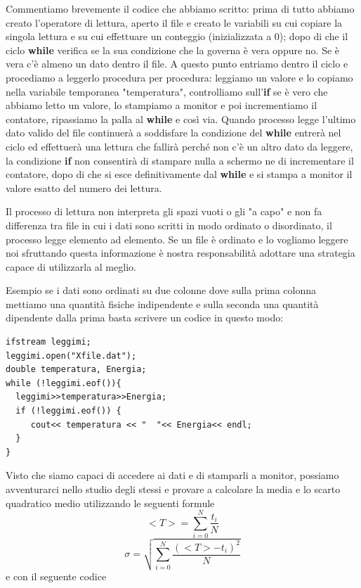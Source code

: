 \documentclass[11pt,fleqn]{book} %
\begin{document}
 Commentiamo brevemente il codice che abbiamo scritto: prima di tutto abbiamo creato l'operatore di lettura, aperto il file e creato le variabili su cui copiare la singola lettura e su cui effettuare un conteggio (inizializzata a 0); dopo di che il ciclo \textbf{while} verifica se la sua condizione che la governa è vera oppure no. Se è vera c'è almeno un dato dentro il file. A questo punto entriamo dentro il ciclo e procediamo  a leggerlo procedura per procedura: leggiamo un valore e lo copiamo nella variabile temporanea "temperatura", controlliamo sull'\textbf{if} se è vero che abbiamo letto un valore, lo stampiamo a monitor e poi incrementiamo il contatore, ripassiamo la palla al \textbf{while} e così via.
 Quando processo legge l'ultimo dato valido del file continuerà a soddisfare la condizione del \textbf{while} entrerà nel ciclo ed effettuerà una lettura che fallirà perché non c'è un altro dato da leggere, la condizione \textbf{if} non consentirà di stampare nulla a schermo ne di incrementare il contatore, dopo di che si esce definitivamente dal \textbf{while} e si stampa a monitor il valore esatto del numero dei lettura.
 
 Il processo di lettura non interpreta gli spazi vuoti o gli "a capo" e non fa differenza tra file in cui i dati sono scritti in modo ordinato o disordinato, il processo legge elemento ad elemento.
 Se un file è ordinato e lo vogliamo leggere noi sfruttando questa informazione è nostra responsabilità adottare una strategia capace di utilizzarla al meglio.
 
 Esempio se i dati sono ordinati su due colonne dove sulla prima colonna mettiamo una quantità fisiche indipendente e sulla seconda una quantità dipendente dalla prima basta scrivere un codice in questo modo:

\begin{verbatim}
ifstream leggimi;
leggimi.open("Xfile.dat");
double temperatura, Energia;
while (!leggimi.eof()){
  leggimi>>temperatura>>Energia;
  if (!leggimi.eof()) {
     cout<< temperatura << "  "<< Energia<< endl;
  }
}
\end{verbatim} 

Visto che siamo capaci di accedere ai dati e di stamparli a monitor, possiamo avventurarci nello studio degli stessi e provare a calcolare la media e lo scarto quadratico medio utilizzando le seguenti formule 
$$<T> = \sum_{i=0}^N \frac{t_i}{N}$$ 
$$\sigma = \sqrt{\sum_{i=0}^N \frac{(<T>-t_i)^2}{N}}$$
e con il seguente codice
\end{document}
